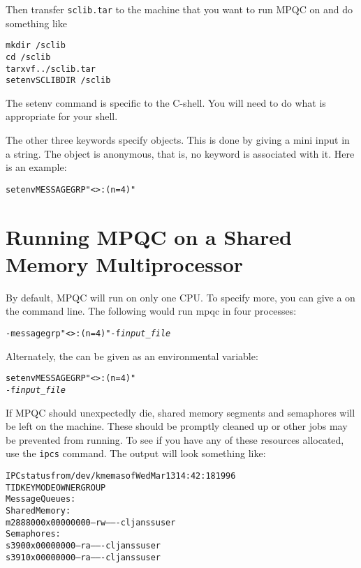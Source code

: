 Then transfer \verb|sclib.tar| to the machine that you want to run
MPQC on and do something like

\begin{alltt}
mkdir ~/sclib
cd ~/sclib
tar xvf ../sclib.tar
setenv SCLIBDIR ~/sclib
\end{alltt}

The setenv command is specific to the C-shell.  You will need to
do what is appropriate for your shell.

The other three keywords specify objects.  This is done by
giving a mini  input in a string.  The
object is anonymous, that is, no keyword is associated with it.
Here is an example:

\begin{alltt}
setenv MESSAGEGRP "<>:(n = 4)"
\end{alltt}

\section{Running MPQC on a Shared Memory Multiprocessor}

By default, MPQC will run on only one CPU.  To specify more, you can give a
  on the command line.
The following would run mpqc in four processes:
\begin{alltt}
 -messagegrp "<>:(n = 4)" -f {\itshape input_file}
\end{alltt}

Alternately, the   can
be given as an environmental variable:
\begin{alltt}
setenv MESSAGEGRP "<>:(n = 4)"
 -f {\itshape input_file}
\end{alltt}

If MPQC should unexpectedly die, shared memory segments and
semaphores will be left on the machine.  These should be promptly
cleaned up or other jobs may be prevented from running.  To
see if you have any of these resources allocated, use the
\verb|ipcs| command.  The output will look something
like:

\begin{alltt}
IPC status from /dev/kmem as of Wed Mar 13 14:42:18 1996
T     ID     KEY        MODE       OWNER    GROUP
Message Queues:
Shared Memory:
m 288800 0x00000000 --rw-------  cljanss     user
Semaphores:
s    390 0x00000000 --ra-------  cljanss     user
s    391 0x00000000 --ra-------  cljanss     user
\end{alltt}

